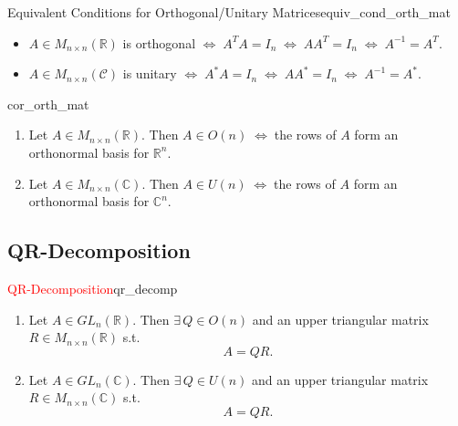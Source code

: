 \begin{lemma}{Equivalent Conditions for Orthogonal/Unitary Matrices}{equiv_cond_orth_mat}
	\begin{itemize}
		\item[$\bullet$] $A \in M_{n\times n}(\mathbb{R})$ is orthogonal $\Longleftrightarrow \; A^TA = I_n \; \Longleftrightarrow \; AA^T = I_n \; \Longleftrightarrow \; A^{-1} = A^T$.
		\item[$\bullet$] $A \in M_{n\times n}(\mathcal{C})$ is unitary $\Longleftrightarrow \; A^{\ast}A = I_n \; \Longleftrightarrow \; AA^{\ast} = I_n \; \Longleftrightarrow \; A^{-1} = A^{\ast}$.
	\end{itemize}
\end{lemma}

\begin{corollary}{}{cor_orth_mat}
	\begin{enumerate}
		\item Let $A \in M_{n\times n}(\mathbb{R})$. Then $A \in O(n) \; \Longleftrightarrow \; $the rows of $A$ form an orthonormal basis for $\mathbb{R}^n$.
		\item Let $A \in M_{n\times n}(\mathbb{C})$. Then $A \in U(n) \; \Longleftrightarrow \;$the rows of $A$ form an orthonormal basis for $\mathbb{C}^n$.
	\end{enumerate}
\end{corollary}

\subsection{QR-Decomposition}
\begin{theorem}{\textcolor{red}{QR-Decomposition}}{qr_decomp}
	\begin{enumerate}
		\item Let $A \in GL_n(\mathbb{R})$. Then $\exists\, Q \in O(n)$ and an upper triangular matrix $R \in M_{n \times n}(\mathbb{R})$ s.t.
		\[
			A = QR.
		\]
		\item Let $A \in GL_n(\mathbb{C})$. Then $\exists \, Q \in U(n)$ and an upper triangular matrix $R \in M_{n \times n}(\mathbb{C})$ s.t. 
		\[
			A = QR.
		\]
	\end{enumerate}
\end{theorem}

